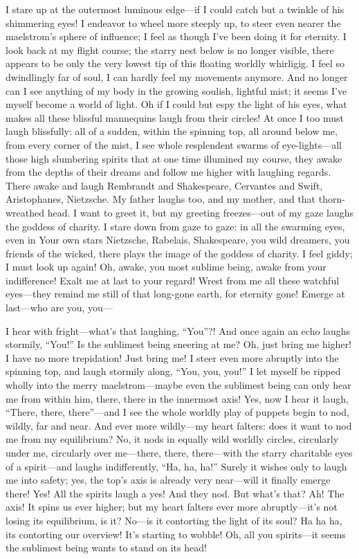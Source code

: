 \documentclass[12pt,a4paper]{article}
\begin{document}
I stare up at the outermost luminous edge—if I could catch but a twinkle of his shimmering eyes! I endeavor to wheel more steeply up, to steer even nearer the maelstrom’s sphere of influence; I feel as though I’ve been doing it for eternity. I look back at my flight course; the starry nest below is no longer visible, there appears to be only the very lowest tip of this floating worldly whirligig. I feel so dwindlingly far of soul, I can hardly feel my movements anymore. And no longer can I see anything of my body in the growing soulish, lightful mist; it seems I’ve myself become a world of light. Oh if I could but espy the light of his eyes, what makes all these blissful mannequins laugh from their circles! At once I too must laugh blissfully: all of a sudden, within the spinning top, all around below me, from every corner of the mist, I see whole resplendent swarms of eye-lights—all those high slumbering spirits that at one time illumined my course, they awake from the depths of their dreams and follow me higher with laughing regards. There awake and laugh Rembrandt and Shakespeare, Cervantes and Swift, Aristophanes, Nietzsche. My father laughs too, and my mother, and that thorn-wreathed head. I want to greet it, but my greeting freezes—out of my gaze laughs the goddess of charity. I stare down from gaze to gaze: in all the swarming eyes, even in Your own stars Nietzsche, Rabelais, Shakespeare, you wild dreamers, you friends of the wicked, there plays the image of the goddess of charity. I feel giddy; I must look up again! Oh, awake, you most sublime being, awake from your indifference! Exalt me at last to your regard! Wrest from me all these watchful eyes—they remind me still of that long-gone earth, for eternity gone! Emerge at last—who are you, you—

I hear with fright—what’s that laughing, “You”?! And once again an echo laughs stormily, “You!” Is the sublimest being sneering at me? Oh, just bring me higher! I have no more trepidation! Just bring me! I steer even more abruptly into the spinning top, and laugh stormily along, “You, you, you!” I let myself be ripped wholly into the merry maelstrom—maybe even the sublimest being can only hear me from within him, there, there in the innermost axis! Yes, now I hear it laugh, “There, there, there”—and I see the whole worldly play of puppets begin to nod, wildly, far and near. And ever more wildly—my heart falters: does it want to nod me from my equilibrium? No, it nods in equally wild worldly circles, circularly under me, circularly over me—there, there, there—with the starry charitable eyes of a spirit—and laughs indifferently, “Ha, ha, ha!” Surely it wishes only to laugh me into safety; yes, the top’s axis is already very near—will it finally emerge there! Yes! All the spirits laugh a yes! And they nod. But what’s that? Ah! The axis! It spins us ever higher; but my heart falters ever more abruptly—it’s not losing its equilibrium, is it? No—is it contorting the light of its soul? Ha ha ha, its contorting our overview! It’s starting to wobble! Oh, all you spirits—it seems the sublimest being wants to stand on its head!
\end{document}
